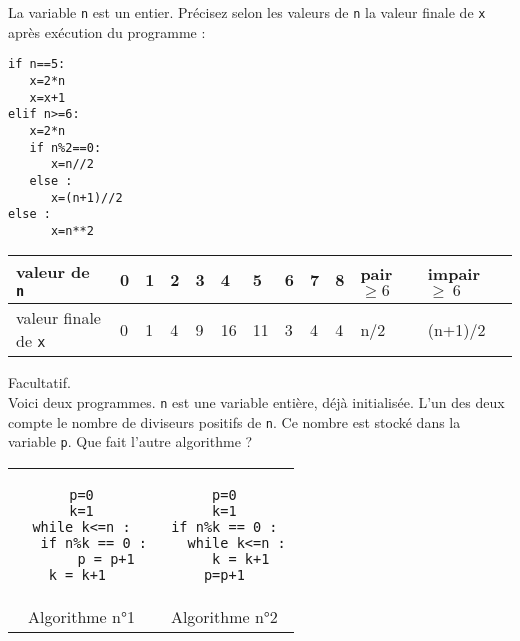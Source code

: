 \begin{exercice}
La variable \verb?n? est un entier. Précisez selon les valeurs de \verb?n? la valeur finale de \verb?x? après exécution du programme :
\begin{verbatim}
if n==5:
   x=2*n
   x=x+1
elif n>=6:
   x=2*n
   if n%2==0:
      x=n//2
   else :
      x=(n+1)//2         
else :
      x=n**2
\end{verbatim}
\end{exercice}
\bigskip

\begin{solution}
\begin{tabular}{l|l|l|l|l|l|l|l|l|l|l|l}
valeur de \verb?n? &0&1&2&3&4&5&6&7&8&pair $\geq 6$ &impair $\geq\ 6$ \\ \hline
valeur finale de \verb?x? & 0&1&4&9&16&11&3&4&4&n/2&(n+1)/2
\end{tabular}
\end{solution}





\begin{exercice}Facultatif.\\
Voici deux programmes. \verb?n? est une variable entière, déjà initialisée. L'un des deux compte le nombre de diviseurs positifs de \verb?n?. Ce nombre est stocké dans la variable \verb?p?. Que fait l'autre algorithme ?
\begin{center}
\begin{tabular}{cc}
\begin{minipage}{7cm}
\begin{verbatim}
p=0
k=1
while k<=n :
   if n%k == 0 :
      p = p+1
   k = k+1    
\end{verbatim}
\end{minipage}\hspace{1cm} 
&
\begin{minipage}{7cm}
\begin{verbatim}
p=0
k=1
if n%k == 0 :
   while k<=n :
      k = k+1  
   p=p+1   
\end{verbatim}
\end{minipage}\\
Algorithme n°1 & Algorithme n°2
\end{tabular}
\end{center}
\end{exercice}

